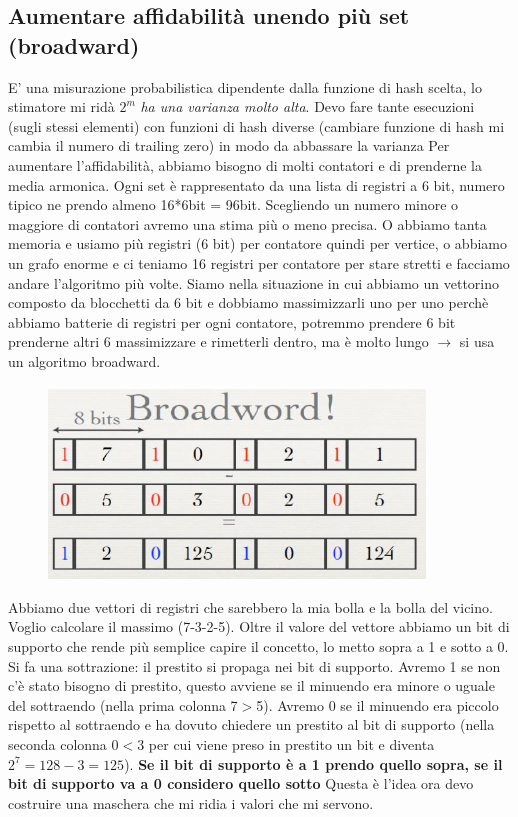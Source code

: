 \documentclass[12pt,italian]{report}
\begin{document}
\subsection{Aumentare affidabilità unendo più set (broadward)}
\label{broadward} 
E' una misurazione probabilistica dipendente dalla funzione di hash scelta, lo stimatore mi ridà $2^m$ \textit{ha una varianza molto alta}. Devo fare tante esecuzioni (sugli stessi elementi) con funzioni di hash diverse (cambiare funzione di hash mi cambia il numero di trailing zero) in modo da abbassare la varianza
\bigbreak
Per aumentare l'affidabilità, abbiamo bisogno di molti contatori e di prenderne la media armonica. Ogni set è rappresentato da una lista di registri a 6 bit, numero tipico ne prendo almeno 16*6bit = 96bit.
\bigbreak
Scegliendo un numero minore o maggiore di contatori avremo una stima più o meno precisa. O abbiamo tanta memoria e usiamo più registri (6 bit) per contatore quindi per vertice, o abbiamo un grafo enorme e ci teniamo 16 registri per contatore per stare stretti e facciamo andare l'algoritmo più volte. 
\bigbreak
Siamo nella situazione in cui abbiamo un vettorino composto da blocchetti da 6 bit e dobbiamo massimizzarli uno per uno perchè abbiamo batterie di registri per ogni contatore, potremmo prendere 6 bit prenderne altri 6 massimizzare e rimetterli dentro, ma è molto lungo $\rightarrow{}$ si usa un algoritmo broadward.

\begin{figure}[h]
	\centering
	\includegraphics[width=100mm]{image/broad1.png}
	\label{fig:br1}
\end{figure}

Abbiamo due vettori di registri che sarebbero la mia bolla e la bolla del vicino. Voglio calcolare il massimo (7-3-2-5). Oltre il valore del vettore abbiamo un bit di supporto che rende più semplice capire il concetto, lo metto sopra a 1 e sotto a 0.
\bigbreak
Si fa una sottrazione: il prestito si propaga nei bit di supporto. Avremo 1 se non c'è stato bisogno di prestito, questo avviene se il minuendo era minore o uguale del sottraendo (nella prima colonna 7$>$5). Avremo 0 se il minuendo era piccolo rispetto al sottraendo e ha dovuto chiedere un prestito al bit di supporto (nella seconda colonna 0$<$3 per cui viene preso in prestito un bit e diventa $2^7 = 128 - 3 = 125$). 
\textbf{Se il bit di supporto è a 1 prendo quello sopra, se il bit di supporto va a 0 considero quello sotto}
\bigbreak
\noindent Questa è l'idea ora devo costruire una maschera che mi ridia i valori che mi servono.
\clearpage
\end{document}
